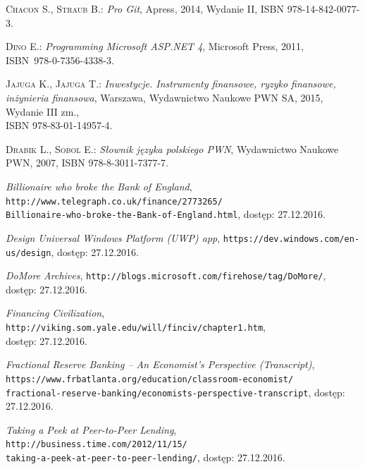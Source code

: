 \documentclass[a4paper,twoside,titlepage,openright]{book}
\begin{document}
 
 
 
\listoffigures





\begin{thebibliography}{99}

 \textsc{Chacon S., Straub B.:}
\textit{Pro Git}, Apress, 2014, Wydanie II, ISBN 978-14-842-0077-3.

 \textsc{Dino E.:}
\textit{Programming Microsoft ASP.NET 4}, Microsoft Press, 2011, \\ISBN~978-0-7356-4338-3.

 \textsc{Jajuga K., Jajuga T.:}
\textit{Inwestycje. Instrumenty finansowe, ryzyko finansowe, inżynieria finansowa}, Warszawa, Wydawnictwo Naukowe PWN SA, 2015, Wydanie III zm., \\ISBN 978-83-01-14957-4.

 \textsc{Drabik L., Sobol	E.:}
\textit{Słownik języka polskiego PWN}, Wydawnictwo Naukowe PWN, 2007, ISBN 978-8-3011-7377-7.

 \textit{Billionaire who broke the Bank of England}, 
\texttt{http://www.telegraph.co.uk/finance/2773265/\\Billionaire-who-broke-the-Bank-of-England.html}, dostęp: 27.12.2016.

 \textit{Design Universal Windows Platform (UWP) app}, 
\texttt{https://dev.windows.com/en-us/design}, dostęp: 27.12.2016.

 \textit{DoMore Archives}, 
\texttt{http://blogs.microsoft.com/firehose/tag/DoMore/}, \\dostęp: 27.12.2016.

 \textit{Financing Civilization}, 
\texttt{http://viking.som.yale.edu/will/finciv/chapter1.htm}, \\dostęp: 27.12.2016.

 \textit{Fractional Reserve Banking -- An Economist's Perspective (Transcript)}, \\
\texttt{https://www.frbatlanta.org/education/classroom-economist/\\fractional-reserve-banking/economists-perspective-transcript}, dostęp: 27.12.2016.

 \textit{Taking a Peek at Peer-to-Peer Lending}, 
\texttt{http://business.time.com/2012/11/15/\\taking-a-peek-at-peer-to-peer-lending/}, dostęp: 27.12.2016.


\end{thebibliography}
\end{document}
